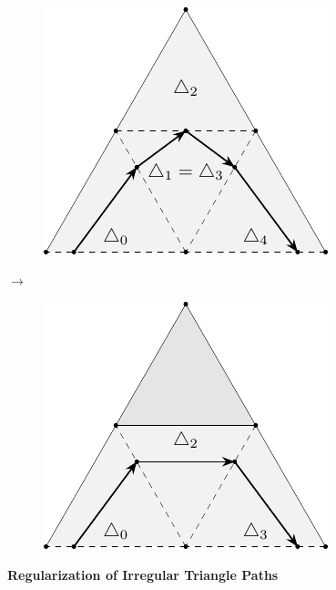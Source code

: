 \documentclass{stdlocal}
\begin{document}
  \begin{figure}
    \centering
    \begin{subfigure}[c]{0.4\linewidth}
      \centering
      \includegraphics[width=\linewidth]{figures/surface-mesh-curve-artifact.pdf}
    \end{subfigure}
    \hfill
    $\longrightarrow$
    \hfill
    \begin{subfigure}[c]{0.4\linewidth}
      \centering
      \includegraphics[width=\linewidth]{figures/surface-mesh-curve-artifact-removed.pdf}
    \end{subfigure}
    \caption[Regularization of Irregular Triangle Paths]{
      \textbf{Regularization of Irregular Triangle Paths}\\
    }
    \label{fig:surface-mesh-curves-face-based-regularization}
  \end{figure}
\end{document}
